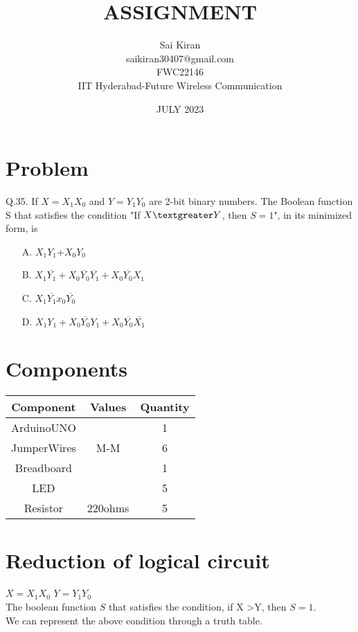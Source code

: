 \documentclass{article}
\title{ASSIGNMENT}
\date{JULY 2023}
\author{Sai Kiran \\saikiran30407@gmail.com\\FWC22146\\IIT Hyderabad-Future Wireless Communication }
\date{}
\begin{document}
\maketitle
 \tableofcontents

\pagebreak
\section{Problem}
 Q.35.  If $X = X_1X_0$ and $Y = Y_1Y_0$ are 2-bit binary numbers. The Boolean function S that satisfies the condition "If $X \textgreater Y$, then $S= 1$", in its minimized form, is\\
 \begin{enumerate}
 
     \item[A.] $X_1Y_1$+$X_0Y_0$
     \item[B.] $X_1\overline{Y_1}+X_0\overline{Y_0}\overline{Y_1}+X_0\overline{Y_0}X_1$
     \item[C.] $X_1\overline{Y_1}x_0\overline{Y_0}$
     \item[D.] $X_1Y_1+X_0\overline{Y_0}Y_1+X_0\overline{Y_0}\overline{X_1}$
 \end{enumerate}
 
 \section{Components}
  \begin{table}[h]
  \centering
   \begin{tabular}{|c|c|c|}
   \hline
   \textbf{Component}& \textbf{Values} & \textbf{Quantity}\\
\hline
ArduinoUNO &  & 1 \\  
\hline
JumperWires& M-M & 6 \\ 
\hline
Breadboard &  & 1 \\
\hline
LED & &5 \\
\hline
Resistor &220ohms & 5\\
\hline
   \end{tabular}
   \end{table}


\section{Reduction of logical circuit}


    $X=X_1X_0$ $Y=Y_1Y_0$\\
    The boolean function $S$ that satisfies the condition,
    if X \textgreater Y, then  $S=1$.\\
    We can represent the above condition through a truth table.
\end{document}
